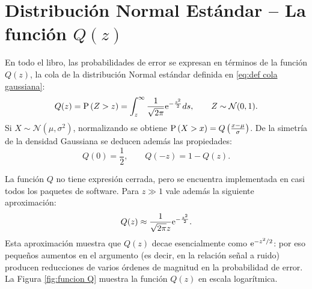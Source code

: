 \section{Distribución Normal Estándar -- La función $Q(z)$}\label{app:cola gaussiana}

En todo el libro, las probabilidades de error se expresan en términos de la función $Q(z)$, la cola de la distribución Normal estándar definida en \eqref{eq:def cola gaussiana}:
\begin{equation*}
    Q(z) = \mathrm{P}\left(Z>z\right) = \int_z^\infty \frac{1}{\sqrt{2\pi}} \mathrm{e}^{-\frac{s^2}{2}} ds, \qquad Z\sim\mathcal{N}(0,1).
\end{equation*}
Si $X\sim\mathcal{N}(\mu,\sigma^2)$, normalizando se obtiene $\mathrm{P}\left(X>x\right) = Q\left(\frac{x-\mu}{\sigma}\right)$. De la simetría de la densidad Gaussiana se deducen además las propiedades:
\begin{equation*}
    Q(0) = \frac{1}{2}, \qquad Q(-z) = 1-Q(z).
\end{equation*}

La función $Q$ no tiene expresión cerrada, pero se encuentra implementada en casi todos los paquetes de software. Para $z\gg 1$ vale además la siguiente aproximación:
\begin{equation}\label{eq:aprox Q}
    Q(z) \approx \frac{1}{\sqrt{2\pi}z}\mathrm{e}^{-\frac{z^2}{2}}.
\end{equation}
Esta aproximación muestra que $Q(z)$ decae esencialmente como $\mathrm{e}^{-z^2/2}$: por eso pequeños aumentos en el argumento (es decir, en la relación señal a ruido) producen reducciones de varios órdenes de magnitud en la probabilidad de error. La Figura \ref{fig:funcion Q} muestra la función $Q(z)$ en escala logarítmica.

